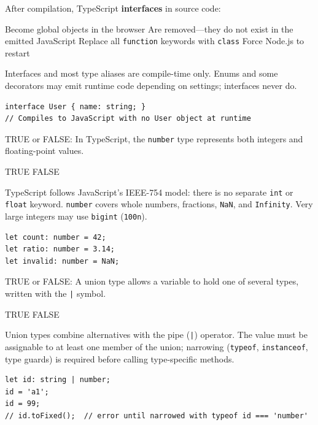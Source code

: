 \newpage



\question[4]
After compilation, TypeScript \textbf{interfaces} in source code:
\begin{choices}
  \choice Become global objects in the browser
  \CorrectChoice Are removed---they do not exist in the emitted JavaScript
  \choice Replace all \lstinline[style=tsinline]|function| keywords with \lstinline[style=tsinline]|class|
  \choice Force Node.js to restart
\end{choices}
\begin{solution}
  Interfaces and most type aliases are compile-time only. Enums and some decorators may emit runtime code depending on settings; interfaces never do.
\begin{lstlisting}[style=ts]
interface User { name: string; }
// Compiles to JavaScript with no User object at runtime
\end{lstlisting}
\end{solution}

\question[4]
TRUE or FALSE: In TypeScript, the \lstinline[style=tsinline]|number| type represents both integers and floating-point values.
\begin{choices}
  \CorrectChoice TRUE
  \choice FALSE
\end{choices}
\begin{solution}
  TypeScript follows JavaScript's IEEE-754 model: there is no separate \lstinline[style=tsinline]|int| or \lstinline[style=tsinline]|float| keyword. \lstinline[style=tsinline]|number| covers whole numbers, fractions, \lstinline[style=tsinline]|NaN|, and \lstinline[style=tsinline]|Infinity|. Very large integers may use \lstinline[style=tsinline]|bigint| (\lstinline[style=tsinline]|100n|).
\begin{lstlisting}[style=ts]
let count: number = 42;
let ratio: number = 3.14;
let invalid: number = NaN;
\end{lstlisting}
\end{solution}

\question[4]
TRUE or FALSE: A union type allows a variable to hold one of several types, written with the \lstinline[style=tsinline]!|! symbol.
\begin{choices}
  \CorrectChoice TRUE
  \choice FALSE
\end{choices}
\begin{solution}
  Union types combine alternatives with the pipe (\lstinline[style=tsinline]!|!) operator. The value must be assignable to at least one member of the union; narrowing (\lstinline[style=tsinline]|typeof|, \lstinline[style=tsinline]|instanceof|, type guards) is required before calling type-specific methods.
\begin{lstlisting}[style=ts]
let id: string | number;
id = 'a1';
id = 99;
// id.toFixed();  // error until narrowed with typeof id === 'number'
\end{lstlisting}
\end{solution}




